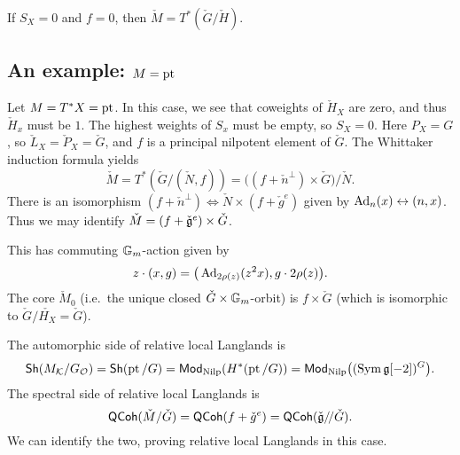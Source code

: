 \documentclass{article}
\begin{document}
\begin{ex}
	If $S_X = 0$ and $f = 0$, then $\check{M} = T^*(\check{G} / \check{H})$.
\end{ex}

\subsection{An example: $M = \operatorname{pt}$}

\begin{ex}
	Let $M = T^*X = \operatorname{pt}$.
	In this case, we see that coweights of $\check{H}_X$ are zero, and thus $\check{H}_x$ must be $1$.
	The highest weights of $S_x$ must be empty, so $S_X = 0$.
	Here $P_X = G$, so $\check{L}_X = \check{P}_X = \check{G}$, and $f$ is a principal nilpotent element of $\check{G}$.
	The Whittaker induction formula yields 
	\[
		\check{M} = T^*(\check{G} / (\check{N}, f)) = \big((f + \check{n}^\perp) \times \check{G}\big) / \check{N}.
	\]
	There is an isomorphism $(f + \check{n}^\perp) \Leftrightarrow \check{N} \times (f + \check{g}^e)$ given by $\operatorname{Ad}_n(x) \leftrightarrow (n, x)$.
	Thus we may identify $\check{M} = (f + \check{\mathfrak{g}}^e) \times \check{G}$.

	This has commuting $\mathbb{G}_m$-action given by
	\[
		z \cdot (x, g) = \big(\operatorname{Ad}_{2\rho(z)}(z^2 x), g \cdot 2\rho(z)\big).
	\]
	The core $\check{M}_0$ (i.e.\ the unique closed $\check{G} \times \mathbb{G}_m$-orbit) is $f \times \check{G}$ (which is isomorphic to $\check{G} / \check{H_X} = \check{G}$).

	The automorphic side of relative local Langlands is 
	\[
		\mathsf{Sh}(M_{\mathcal{K}} / G_{\mathcal{O}}) = \mathsf{Sh}(\operatorname{pt} / G) = \mathsf{Mod}_{\mathrm{Nilp}}(H^*(\operatorname{pt} / G)) = \mathsf{Mod}_{\mathrm{Nilp}}\big((\operatorname{Sym} \mathfrak{g}[-2])^G\big).
	\]
	The spectral side of relative local Langlands is
	\[
		\mathsf{QCoh}(\check{M} / \check{G}) = \mathsf{QCoh}(f + \check{g}^e) = \mathsf{QCoh}(\check{\mathfrak{g}} /\mkern-3mu/ \check{G}).
	\]
	We can identify the two, proving relative local Langlands in this case.
\end{ex}
\end{document}
